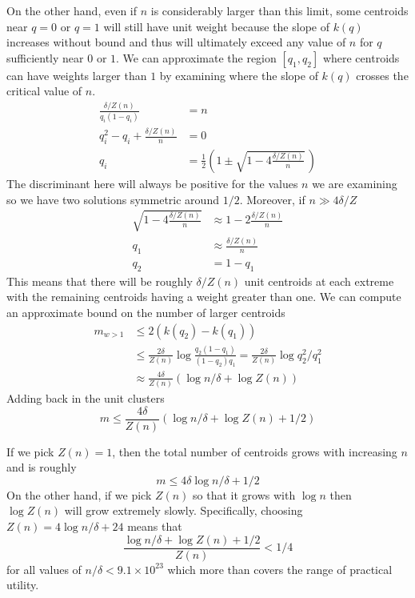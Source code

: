 \documentclass[11pt]{amsart}
\begin{document}
On the other hand, even if $n$ is considerably larger than this limit, some centroids near $q=0$ or $q=1$ will still have unit weight because the slope of $k(q)$ increases without bound and thus will ultimately exceed any value of $n$ for $q$ sufficiently near $0$ or $1$. We can approximate the region $[q_1, q_2]$ where centroids can have weights larger than $1$ by examining where the slope of $k(q)$ crosses the critical value of $n$.
\[
\begin{aligned}
{\frac  {\delta/Z(n)} {q_i (1-q_i) }  } &= n \\
q_i^2 - q_i + \frac {\delta/Z(n)} n &= 0 \\
q_i &= \frac 1 2 \left( { 1 \pm \sqrt { 1 - 4 \frac {\delta/Z(n)} n } } \, \right)
\end{aligned}
\]
The discriminant here will always be positive for the values $n$ we are examining so we have two solutions symmetric around $1/2$. Moreover, if $n \gg 4\delta / Z$
\[
\begin{aligned}
\sqrt { 1 - 4 \frac {\delta/Z(n)} n } &\approx 1 - 2 \frac {\delta / Z(n)} n \\
q_1 &\approx {   \frac {\delta/Z(n)} n  } \,  \\
q_2 &= 1-q_1
\end{aligned}
\]
This means that there will be roughly $\delta/Z(n)$ unit centroids at each extreme with the remaining centroids having a weight greater than one. We can compute an approximate bound on the number of larger centroids
\[
\begin{aligned}
m_{w>1} &\le 2\left( k(q_2) -k(q_1) \right) \\ 
&\le  \frac {2\delta} {Z(n)} \log {\frac {q_2 (1-q_1)} {(1-q_2) q_1}} = \frac {2\delta} {Z(n)} \log { {q_2^2} / { q_1^2}} \\
&\approx  \frac {4 \delta} {Z(n)} \left(\log  n/ \delta + \log Z(n)\right)
\end{aligned}
\]
Adding back in the unit clusters
\[
m \le  \frac {4 \delta} {Z(n)} \left(\log  n/ \delta + \log Z(n) + 1/2\right)
\]

If we pick $Z(n) = 1$, then the total number of centroids grows with increasing $n$ and is roughly
\[
m \le 4\delta  \log n/\delta + 1/2
\]  
On the other hand, if we pick $Z(n)$ so that it grows with $\log n$ then $\log Z(n)$  will grow extremely slowly. Specifically, choosing $Z(n) = 4 \log n/\delta + 24$ means that 
\[
\frac {\log n / \delta + \log Z(n)+1/2} {Z(n)}  < 1/4
\]
for all values of $n/\delta < 9.1 \times 10^{23}$ which more than covers the range of practical utility.
\end{document}
